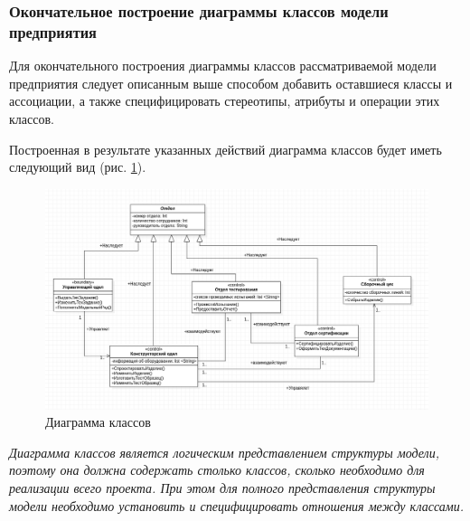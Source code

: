 \documentclass[a4paper,12pt]{report}
\begin{document}
\subsubsection*{Окончательное построение диаграммы классов модели предприятия}
Для окончательного построения диаграммы классов рассматриваемой модели предприятия следует описанным выше способом добавить оставшиеся классы и ассоциации, а также специфицировать стереотипы, атрибуты и операции этих классов. 

Построенная в результате указанных действий диаграмма классов будет иметь следующий вид (рис. \ref{fig:classdiagram}).

\begin{figure}[h!]
	\centering
	\includegraphics[width=0.9\linewidth]{images/classdiagram}
	\caption{Диаграмма классов}
	\label{fig:classdiagram}
\end{figure}


\textit{Диаграмма классов является логическим представлением структуры модели, поэтому она должна содержать столько классов, сколько необходимо для реализации всего проекта. При этом для полного представления структуры модели необходимо установить и специфицировать отношения между классами.} 
\end{document}
